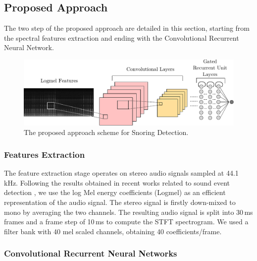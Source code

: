 \subsection{Proposed Approach}

The two step of the proposed approach are detailed in this section, starting from the spectral features extraction and ending with the Convolutional Recurrent Neural Network.

\begin{figure}[t]
	\centering
	\includegraphics[width=0.9\columnwidth]{img/snore_detection_4.pdf}
	\caption[Snoring Detection with CRNNs]{The proposed approach scheme for Snoring Detection.}
	\label{fig:overall}
\end{figure}

\subsubsection{Features Extraction}
The feature extraction stage operates on stereo audio signals sampled at 44.1 kHz. 
Following the results obtained in recent works related to sound event detection \cite{DCASE2017Workshop}, we use the log Mel energy coefficients (Logmel) as an efficient representation of the audio signal. The stereo signal is firstly down-mixed to mono by averaging the two channels. 
The resulting audio signal is split into 30\,ms frames and a frame step of 10\,ms to compute the STFT spectrogram. We used a filter bank with 40 mel scaled channels, obtaining 40 coefficients/frame. 

\subsubsection{Convolutional Recurrent Neural Networks}


